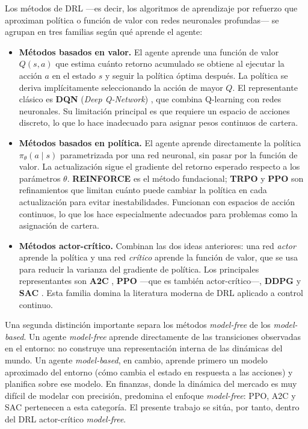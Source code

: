 \documentclass[IB,a4paper]{TFUOC}
\begin{document}
Los métodos de DRL ---es decir, los algoritmos de aprendizaje por refuerzo que aproximan política o función de valor con redes neuronales profundas--- se agrupan en tres familias según qué aprende el agente:

\begin{itemize}
    \item \textbf{Métodos basados en valor.} El agente aprende una función de valor $Q(s, a)$ que estima cuánto retorno acumulado se obtiene al ejecutar la acción $a$ en el estado $s$ y seguir la política óptima después. La política se deriva implícitamente seleccionando la acción de mayor $Q$. El representante clásico es \textbf{DQN} (\textit{Deep Q-Network}) \citep{mnih2015dqn}, que combina Q-learning con redes neuronales. Su limitación principal es que requiere un espacio de acciones discreto, lo que lo hace inadecuado para asignar pesos continuos de cartera.
    \item \textbf{Métodos basados en política.} El agente aprende directamente la política $\pi_\theta(a \mid s)$ parametrizada por una red neuronal, sin pasar por la función de valor. La actualización sigue el gradiente del retorno esperado respecto a los parámetros $\theta$. \textbf{REINFORCE} es el método fundacional; \textbf{TRPO} \citep{schulman2015trpo} y \textbf{PPO} \citep{schulman2017ppo} son refinamientos que limitan cuánto puede cambiar la política en cada actualización para evitar inestabilidades. Funcionan con espacios de acción continuos, lo que los hace especialmente adecuados para problemas como la asignación de cartera.
    \item \textbf{Métodos actor-crítico.} Combinan las dos ideas anteriores: una red \textit{actor} aprende la política y una red \textit{crítico} aprende la función de valor, que se usa para reducir la varianza del gradiente de política. Los principales representantes son \textbf{A2C} \citep{mnih2016a3c}, \textbf{PPO} ---que es también actor-crítico---, \textbf{DDPG} \citep{lillicrap2015ddpg} y \textbf{SAC} \citep{haarnoja2018sac}. Esta familia domina la literatura moderna de DRL aplicado a control continuo.
\end{itemize}

Una segunda distinción importante separa los métodos \textit{model-free} de los \textit{model-based}. Un agente \textit{model-free} aprende directamente de las transiciones observadas en el entorno: no construye una representación interna de las dinámicas del mundo. Un agente \textit{model-based}, en cambio, aprende primero un modelo aproximado del entorno (cómo cambia el estado en respuesta a las acciones) y planifica sobre ese modelo. En finanzas, donde la dinámica del mercado es muy difícil de modelar con precisión, predomina el enfoque \textit{model-free}: PPO, A2C y SAC pertenecen a esta categoría. El presente trabajo se sitúa, por tanto, dentro del DRL actor-crítico \textit{model-free}.
\end{document}
